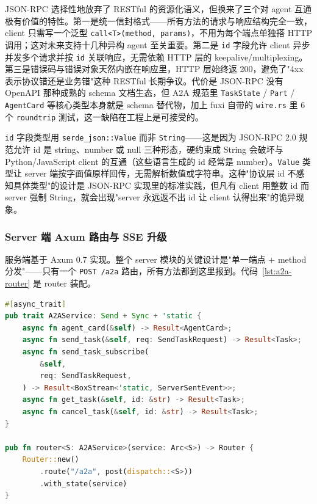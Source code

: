 JSON-RPC 选择性地放弃了 RESTful 的资源化语义，但换来了三个对 agent 互通极有价值的特性。第一是统一信封格式——所有方法的请求与响应结构完全一致，client 只需写一个泛型 \texttt{call<T>(method, params)}，不用为每个端点单独搭 HTTP 调用；这对未来支持十几种异构 agent 至关重要。第二是 \texttt{id} 字段允许 client 异步并发多个请求并按 \texttt{id} 关联响应，无需依赖 HTTP 层的 keepalive/multiplexing。第三是错误码与错误对象天然内嵌在响应里，HTTP 层始终返 200，避免了"4xx 表示协议错还是业务错"这种 RESTful 长期争议。代价是 JSON-RPC 没有 OpenAPI 那种成熟的 schema 文档生态，但 A2A 规范里 \texttt{TaskState} / \texttt{Part} / \texttt{AgentCard} 等核心类型本身就是 schema 替代物，加上 fuxi 自带的 \texttt{wire.rs} 里 6 个 \texttt{roundtrip} 测试，这一缺陷在工程上是可接受的。

\texttt{id} 字段类型用 \texttt{serde\_json::Value} 而非 \texttt{String}——这是因为 JSON-RPC 2.0 规范允许 id 是 string、number 或 null 三种形态，硬约束成 String 会破坏与 Python/JavaScript client 的互通（这些语言生成的 id 经常是 number）。\texttt{Value} 类型让 server 端按字面值原样回传，无需解析数值或字符串。这种"协议层 id 不感知具体类型"的设计是 JSON-RPC 实现里的标准实践，但凡有 client 用整数 id 而 server 强制 String，就会出现"server 永远返不出 id 让 client 认得出来"的诡异现象。

\subsubsection{Server 端 Axum 路由与 SSE 升级}

服务端基于 Axum 0.7 实现。整个 server 模块的关键设计是"单一端点 + method 分发"——只有一个 \texttt{POST /a2a} 路由，所有方法都到这里报到。代码~\ref{lst:a2a-router} 是 router 装配。

\begin{lstlisting}[language=Rust, caption={A2A server router 装配（fuxi-a2a/src/server.rs）}, label={lst:a2a-router}]
#[async_trait]
pub trait A2AService: Send + Sync + 'static {
    async fn agent_card(&self) -> Result<AgentCard>;
    async fn send_task(&self, req: SendTaskRequest) -> Result<Task>;
    async fn send_task_subscribe(
        &self,
        req: SendTaskRequest,
    ) -> Result<BoxStream<'static, ServerSentEvent>>;
    async fn get_task(&self, id: &str) -> Result<Task>;
    async fn cancel_task(&self, id: &str) -> Result<Task>;
}

pub fn router<S: A2AService>(service: Arc<S>) -> Router {
    Router::new()
        .route("/a2a", post(dispatch::<S>))
        .with_state(service)
}
\end{lstlisting}

